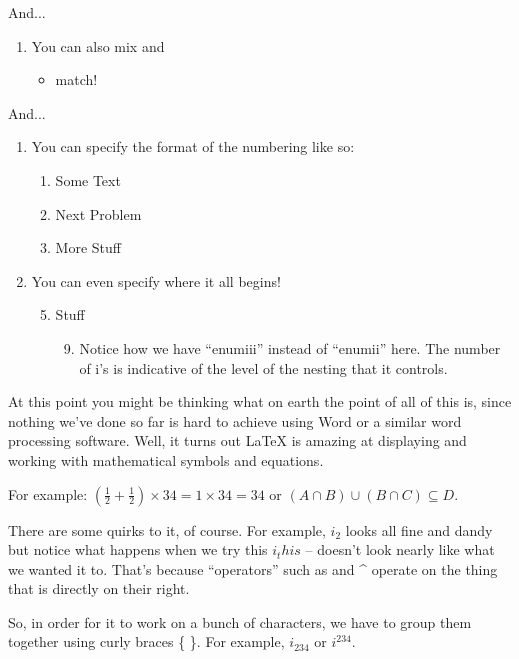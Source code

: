 \documentclass{article}
\begin{document}
And...

\begin{enumerate}
  \item You can also mix and
  \begin{itemize}
    \item match!
  \end{itemize}
\end{enumerate}

And...

\begin{enumerate}
  \item You can specify the format of the numbering like so:
  \begin{enumerate}[Problem 1.]
    \item Some Text
    \item Next Problem
    \item More Stuff
  \end{enumerate}
  \item You can even specify where it all begins!
  \begin{enumerate}
    \setcounter{enumii}{4}
    \item Stuff
    \begin{enumerate}
      \setcounter{enumiii}{8}
      \item Notice how we have ``enumiii'' instead of ``enumii'' here. The number of i's is indicative of the level of the nesting that it controls.
    \end{enumerate}
  \end{enumerate}
\end{enumerate}

At this point you might be thinking what on earth the point of all of this is,
since nothing we've done so far is hard to achieve using Word or a similar
word processing software. Well, it turns out \LaTeX{} \@ is amazing at displaying
and working with mathematical symbols and equations.

For example: $(\frac{1}{2} + \frac{1}{2}) \times 34 = 1 \times 34 = 34$ or
$(A \cap B) \cup (B \cap C) \subseteq D$.

There are some quirks to it, of course. For example, $i_2$ looks all fine and
dandy but notice what happens when we try this $i_this$ -- doesn't look nearly
like what we wanted it to. That's because ``operators'' such as
\textunderscore{} and \^{} operate on the thing that is directly on their right.


So, in order for it to work on a bunch of characters, we have to group them
together using curly braces \{ \}. For example, $i_{234}$ or $i^{234}$.
\end{document}
